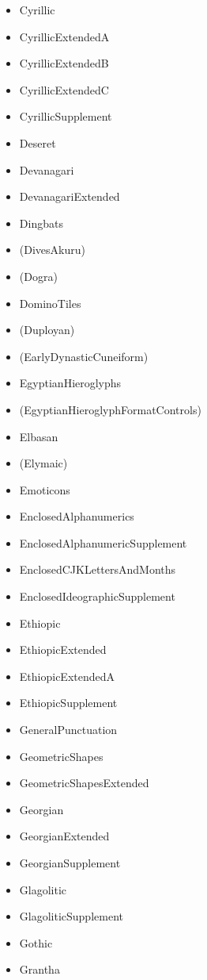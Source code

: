\documentclass{article}
\newenvironment{itemlist}{%
  \begin{itemize}
  \setlength{\itemsep}{0pt}
  \setlength{\parsep}{0pt}
  \setlength{\topsep}{0pt}
  \setlength{\partopsep}{0pt}
  \setlength{\parskip}{0pt}
  \setlength{\labelsep}{5pt}}%
{
  \end{itemize}}
\begin{document}
\begin{multicols*}{2}
\begin{itemlist}
        \item Cyrillic
        \item CyrillicExtendedA
        \item CyrillicExtendedB
        \item CyrillicExtendedC
        \item CyrillicSupplement
        \item Deseret
        \item Devanagari
        \item DevanagariExtended
        \item Dingbats
        \item (DivesAkuru)
        \item (Dogra)
        \item DominoTiles
        \item (Duployan)
        \item (EarlyDynasticCuneiform)
        \item EgyptianHieroglyphs
        \item (EgyptianHieroglyphFormatControls)
        \item Elbasan
        \item (Elymaic)
        \item Emoticons
        \item EnclosedAlphanumerics
        \item EnclosedAlphanumericSupplement
        \item EnclosedCJKLettersAndMonths
        \item EnclosedIdeographicSupplement
        \item Ethiopic
        \item EthiopicExtended
        \item EthiopicExtendedA
        \item EthiopicSupplement
        \item GeneralPunctuation
        \item GeometricShapes
        \item GeometricShapesExtended
        \item Georgian
        \item GeorgianExtended
        \item GeorgianSupplement
        \item Glagolitic
        \item GlagoliticSupplement
        \item Gothic
        \item Grantha

\end{itemlist}
\end{multicols*}
\end{document}
